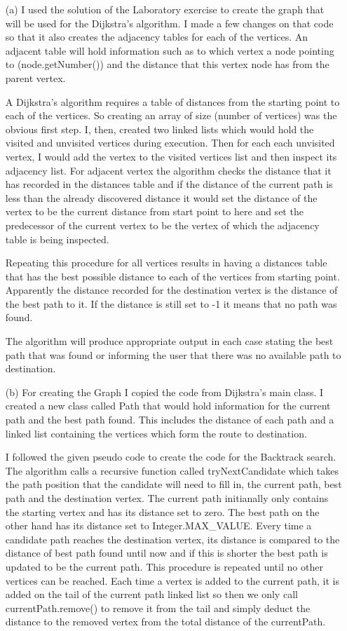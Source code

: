 \documentclass{article}
\begin{document}
\begin{itemize}
\item[(a)] 
I used the solution of the Laboratory exercise to create the graph that will be used for the Dijkstra's algorithm. I made a few changes on that code so that it also creates the adjacency tables for each of the vertices. An adjacent table will hold information such as to which vertex a node pointing to (node.getNumber()) and the distance that this vertex node has from the parent vertex. 

A Dijkstra's algorithm requires a table of distances from the starting point to each of the vertices. So creating an array of size (number of vertices) was the obvious first step. I, then, created two linked lists which would hold the visited and unvisited vertices during execution. Then for each each unvisited vertex, I would add the vertex to the visited vertices list and then inspect its adjacency list. For adjacent vertex the algorithm checks the distance that it has recorded in the distances table and if the distance of the current path is less than the already discovered distance it would set the distance of the vertex to be the current distance from start point to here and set the predecessor of the current vertex to be the vertex of which the adjacency table is being inspected. 

Repeating this procedure for all vertices results in having a distances table that has the best possible distance to each of the vertices from starting point. Apparently the distance recorded for the destination vertex is the distance of the best path to it. If the distance is still set to -1 it means that no path was found.

The algorithm will produce appropriate output in each case stating the best path that was found or informing the user that there was no available path to destination.

\item[(b)]
For creating the Graph I copied the code from Dijkstra's main class.
I created a new class called Path that would hold information for the current path and the best path found. This includes the distance of each path and a linked list containing the vertices which form the route to destination.

I followed the given pseudo code to create the code for the Backtrack search. The algorithm calls a recursive function called tryNextCandidate which takes the path position that the candidate will need to fill in, the current path, best path and the destination vertex. The current path initianally only contains the starting vertex and has its distance set to zero. The best path on the other hand has its distance set to Integer.MAX\_VALUE. Every time a candidate path reaches the destination vertex, its distance is compared to the distance of best path found until now and if this is shorter the best path is updated to be the current path. This procedure is repeated until no other vertices can be reached. Each time a vertex is added to the current path, it is added on the tail of the current path linked list so then we only call currentPath.remove() to remove it from the tail and simply deduct the distance to the removed vertex from the total distance of the currentPath.


\end{itemize}
\end{document}
